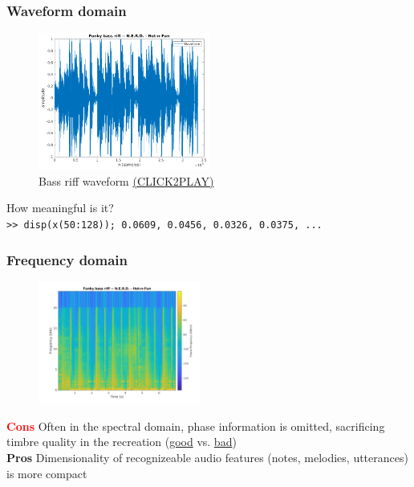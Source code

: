 \documentclass{beamer}
\begin{document}
\begin{frame}[fragile]
	\frametitle{Waveform domain}
	\begin{figure}
	\includegraphics[height=4.5cm]{./4_funkybass.png}
		\caption{Bass riff waveform \href{run:./funkybass.wav}{(CLICK2PLAY)} }
	\end{figure}
	\vspace{-1em}
	How meaningful is it?\\
	{\small{\Verb#>> disp(x(50:128)); 0.0609, 0.0456, 0.0326, 0.0375, ...#}}
\end{frame}

\begin{frame}
	\frametitle{Frequency domain}
	\vspace{-1em}
	\begin{figure}
	\includegraphics[height=4cm]{./5_funkybass_spectrogram.png}
	\end{figure}
	\vspace{-1em}
	\textbf{\textcolor{red}{Cons}}
	Often in the spectral domain, phase information is omitted, sacrificing timbre quality in the recreation (\href{run:./original_phase.wav}{good} vs. \href{run:./random_phase.wav}{bad})\\
	\textbf{\textcolor{ao(english)}{Pros}}
	Dimensionality of recognizeable audio features (notes, melodies, utterances) is more compact 
\end{frame}
\end{document}
